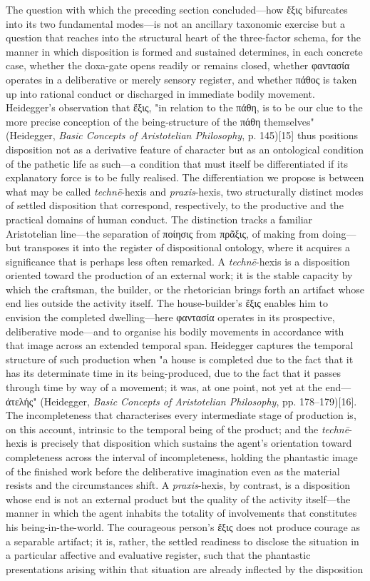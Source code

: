 \documentclass{article}
\begin{document}
The question with which the preceding section concluded—how ἕξις bifurcates into its two fundamental modes—is not an ancillary taxonomic exercise but a question that reaches into the structural heart of the three-factor schema, for the manner in which disposition is formed and sustained determines, in each concrete case, whether the doxa-gate opens readily or remains closed, whether φαντασία operates in a deliberative or merely sensory register, and whether πάθος is taken up into rational conduct or discharged in immediate bodily movement. Heidegger's observation that ἕξις, "in relation to the πάθη, is to be our clue to the more precise conception of the being-structure of the πάθη themselves" (Heidegger, \textit{Basic Concepts of Aristotelian Philosophy}, p. 145)[15] thus positions disposition not as a derivative feature of character but as an ontological condition of the pathetic life as such—a condition that must itself be differentiated if its explanatory force is to be fully realised. The differentiation we propose is between what may be called \textit{technē}-hexis and \textit{praxis}-hexis, two structurally distinct modes of settled disposition that correspond, respectively, to the productive and the practical domains of human conduct. The distinction tracks a familiar Aristotelian line—the separation of ποίησις from πρᾶξις, of making from doing—but transposes it into the register of dispositional ontology, where it acquires a significance that is perhaps less often remarked. A \textit{technē}-hexis is a disposition oriented toward the production of an external work; it is the stable capacity by which the craftsman, the builder, or the rhetorician brings forth an artifact whose end lies outside the activity itself. The house-builder's ἕξις enables him to envision the completed dwelling—here φαντασία operates in its prospective, deliberative mode—and to organise his bodily movements in accordance with that image across an extended temporal span. Heidegger captures the temporal structure of such production when "a house is completed due to the fact that it has its determinate time in its being-produced, due to the fact that it passes through time by way of a movement; it was, at one point, not yet at the end—ἀτελής" (Heidegger, \textit{Basic Concepts of Aristotelian Philosophy}, pp. 178–179)[16]. The incompleteness that characterises every intermediate stage of production is, on this account, intrinsic to the temporal being of the product; and the \textit{technē}-hexis is precisely that disposition which sustains the agent's orientation toward completeness across the interval of incompleteness, holding the phantastic image of the finished work before the deliberative imagination even as the material resists and the circumstances shift. A \textit{praxis}-hexis, by contrast, is a disposition whose end is not an external product but the quality of the activity itself—the manner in which the agent inhabits the totality of involvements that constitutes his being-in-the-world. The courageous person's ἕξις does not produce courage as a separable artifact; it is, rather, the settled readiness to disclose the situation in a particular affective and evaluative register, such that the phantastic presentations arising within that situation are already inflected by the disposition 
\end{document}
